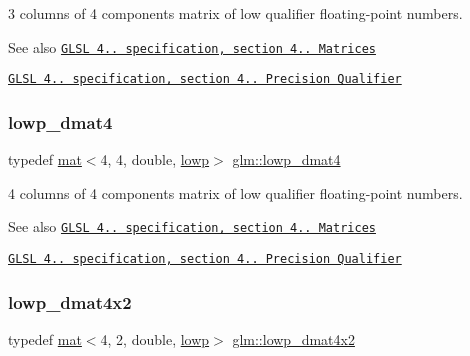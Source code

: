 3 columns of 4 components matrix of low qualifier floating-\/point numbers.

\begin{DoxySeeAlso}{See also}
\href{http://www.opengl.org/registry/doc/GLSLangSpec.4.20.8.pdf}{\tt G\+L\+SL 4.. specification, section 4.. Matrices} 

\href{http://www.opengl.org/registry/doc/GLSLangSpec.4.20.8.pdf}{\tt G\+L\+SL 4.. specification, section 4.. Precision Qualifier} 
\end{DoxySeeAlso}
\mbox{\label{group__core__precision_ga608895f4a515c7ac6cf3a1c2f11e13cc}} 
\subsubsection{\texorpdfstring{lowp\+\_\+dmat4}{lowp\_dmat4}}
{\footnotesize\ttfamily typedef \hyperlink{structglm_1_1mat}{mat}$<$4, 4, double, \hyperlink{namespaceglm_a36ed105b07c7746804d7fdc7cc90ff25ae161af3fc695e696ce3bf69f7332bc2d}{lowp}$>$ \hyperlink{group__core__precision_ga608895f4a515c7ac6cf3a1c2f11e13cc}{glm\+::lowp\+\_\+dmat4}}

4 columns of 4 components matrix of low qualifier floating-\/point numbers.

\begin{DoxySeeAlso}{See also}
\href{http://www.opengl.org/registry/doc/GLSLangSpec.4.20.8.pdf}{\tt G\+L\+SL 4.. specification, section 4.. Matrices} 

\href{http://www.opengl.org/registry/doc/GLSLangSpec.4.20.8.pdf}{\tt G\+L\+SL 4.. specification, section 4.. Precision Qualifier} 
\end{DoxySeeAlso}
\mbox{\label{group__core__precision_gaa61cd1362e63979d3e17d53957d2e17f}} 
\subsubsection{\texorpdfstring{lowp\+\_\+dmat4x2}{lowp\_dmat4x2}}
{\footnotesize\ttfamily typedef \hyperlink{structglm_1_1mat}{mat}$<$4, 2, double, \hyperlink{namespaceglm_a36ed105b07c7746804d7fdc7cc90ff25ae161af3fc695e696ce3bf69f7332bc2d}{lowp}$>$ \hyperlink{group__core__precision_gaa61cd1362e63979d3e17d53957d2e17f}{glm\+::lowp\+\_\+dmat4x2}}

